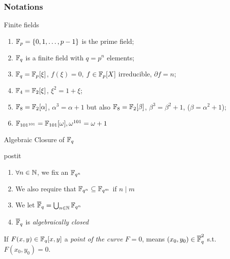 \documentclass[10pt,handout]{beamer} %
\begin{document}
\begin{frame}
\frametitle{Notations}

\begin{exampleblock}{Finite fields}
 \begin{enumerate}[<+-| alert@+>]
 \item $\mathbb F_p=\{0,1,\ldots,p-1\}$ is the prime field;
 \item $\mathbb F_q$ is a finite field with $q=p^n$ elements;
 \item $\mathbb F_q=\mathbb F_p[\xi]$, $f(\xi)=0$, $f\in\mathbb F_p[X]$
irreducible, $\partial f=n$;
\item $\mathbb F_4=\mathbb F_2[\xi]$, $\xi^2=1+\xi$;
\item $\mathbb F_8=\mathbb F_2[\alpha]$, $\alpha^3=\alpha+1$ but also $\mathbb F_8=\mathbb F_2[\beta]$, $\beta^3=\beta^2+1$, ($\beta=\alpha^2+1$);
\item $\mathbb F_{101^{101}}=\mathbb F_{101}[\omega], \omega^{101}=\omega+1$
\end{enumerate}
\end{exampleblock}

{Algebraic Closure of $\mathbb F_q$}

 \begin{beamercolorbox}[rounded=true,shadow=true,wd=7.5cm,center]{postit}
         \begin{enumerate}[<+-| alert@+>]
          \item $\forall n\in\mathbb N$, we fix an $\mathbb F_{q^n}$
          \item We also require that $\mathbb F_{q^n}\subseteq\mathbb F_{q^m}$ if $n\mid m$
          \item We let $\overline{\mathbb F}_q=\bigcup_{n\in\mathbb N}\mathbb F_{q^n}$
\item $\overline{\mathbb F}_q$ is \emph{algebraically closed}
         \end{enumerate}
\end{beamercolorbox}

\begin{scriptsize}
If $F(x,y)\in\mathbb F_q[x,y]$ a \emph{point of the curve $F=0$}, means $(x_0,y_0)\in\overline{\mathbb F}_q^2$ s.t.
$F(x_0,y_0)=0$.
\end{scriptsize}\end{frame}
\end{document}
